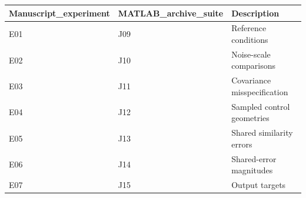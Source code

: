 \begin{tabular}{lll}
\hline
Manuscript\_experiment & MATLAB\_archive\_suite & Description \\
\hline
E01 & J09 & Reference conditions \\
E02 & J10 & Noise-scale comparisons \\
E03 & J11 & Covariance misspecification \\
E04 & J12 & Sampled control geometries \\
E05 & J13 & Shared similarity errors \\
E06 & J14 & Shared-error magnitudes \\
E07 & J15 & Output targets \\
\hline
\end{tabular}
